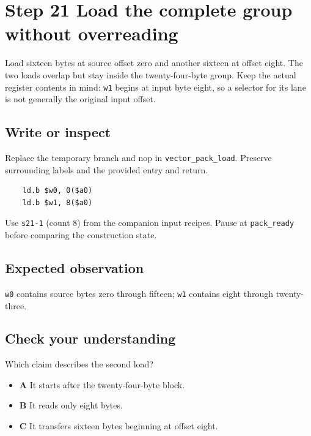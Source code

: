\section{Step 21 Load the complete group without overreading}\label{rgb-s21}

Load sixteen bytes at source offset zero and another sixteen at offset eight. The two loads overlap but stay inside the twenty-four-byte group. Keep the actual register contents in mind: \texttt{w1} begins at input byte eight, so a selector for its lane is not generally the original input offset.

\subsection{Write or inspect}
Replace the temporary branch and nop in \texttt{vector\_pack\_load}. Preserve surrounding labels and the provided entry and return.

\begin{verbatim}
    ld.b $w0, 0($a0)
    ld.b $w1, 8($a0)
\end{verbatim}
Use \texttt{s21-1} (count 8) from the companion input recipes. Pause at \texttt{pack\_ready} before comparing the construction state.

\subsection{Expected observation}
\texttt{w0} contains source bytes zero through fifteen; \texttt{w1} contains eight through twenty-three.

\subsection{Check your understanding}
Which claim describes the second load?

\begin{itemize}
  \item \textbf{A} It starts after the twenty-four-byte block.
  \item \textbf{B} It reads only eight bytes.
  \item \textbf{C} It transfers sixteen bytes beginning at offset eight.
\end{itemize}
